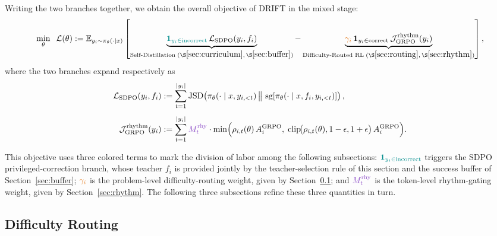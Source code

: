 \documentclass{article}
\newcommand{\sg}{\operatorname{sg}}
\begin{document}
Writing the two branches together, we obtain the overall objective of DRIFT in the mixed stage:
\begin{equation}
\label{eq:master}
\min_{\theta}\;\;\mathcal{L}(\theta):=
\mathbb{E}_{y_i\sim\pi_{\theta}(\cdot\mid x)}
\left[
\underbrace{
{\color{cIncorrect}\mathbf{1}_{y_i\in\mathrm{incorrect}}}\,
\mathcal{L}_{\mathrm{SDPO}}(y_i,f_i)
}_{\text{Self-Distillation}\;(\S\ref{sec:curriculum},\,\S\ref{sec:buffer})}
-
\underbrace{
{\color{cGamma}\gamma_i}\,
\mathbf{1}_{y_i\in\mathrm{correct}}\,
\mathcal{J}_{\mathrm{GRPO}}^{\mathrm{rhythm}}(y_i)
}_{\text{Difficulty-Routed RL}\;(\S\ref{sec:routing},\,\S\ref{sec:rhythm})}
\right],
\end{equation}
where the two branches expand respectively as
\begin{align}
\mathcal{L}_{\mathrm{SDPO}}(y_i,f_i)&:=\sum_{t=1}^{|y_i|}
\mathrm{JSD}\!\left(\pi_\theta(\cdot\mid x,y_{i,<t})\,\big\Vert\,
\sg\!\left[\pi_\theta(\cdot\mid x,f_i,y_{i,<t})\right]\right), \\[4pt]
\mathcal{J}_{\mathrm{GRPO}}^{\mathrm{rhythm}}(y_i)&:=\sum_{t=1}^{|y_i|}
{\color{cRhythm}M^{\mathrm{rhy}}_{t}}\cdot
\min\!\Big(\rho_{i,t}(\theta)\,A_i^{\text{GRPO}},\;
\mathrm{clip}\!\big(\rho_{i,t}(\theta),1-\epsilon,1+\epsilon\big)\,A_i^{\text{GRPO}}\Big).
\end{align}

This objective uses three colored terms to mark the division of labor among the following subsections: ${\color{cIncorrect}\mathbf{1}_{y_i\in\mathrm{incorrect}}}$ triggers the SDPO privileged-correction branch, whose teacher $f_i$ is provided jointly by the teacher-selection rule of this section and the success buffer of Section~\ref{sec:buffer}; ${\color{cGamma}\gamma_i}$ is the problem-level difficulty-routing weight, given by Section~\ref{sec:routing}; and ${\color{cRhythm}M^{\mathrm{rhy}}_{t}}$ is the token-level rhythm-gating weight, given by Section~\ref{sec:rhythm}. The following three subsections refine these three quantities in turn.

\subsection{Difficulty Routing}
\label{sec:routing}
\end{document}
